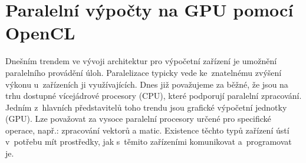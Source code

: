 %

\chapter{Paralelní výpočty na GPU pomocí OpenCL}
\label{ch:opencl}
Dnešním trendem ve vývoji architektur pro výpočetní zařízení je umožnění paralelního provádění
úloh. Paralelizace typicky vede ke~znatelnému zvýšení výkonu u~zařízeních ji využívajících. Dnes již
považujeme za běžné, že jsou na trhu dostupné vícejádrové procesory (CPU), které podporují paralelní
zpracování. Jedním z~hlavních představitelů toho trendu jsou grafické výpočetní jednotky (GPU). Lze
považovat za vysoce paralelní procesory určené pro specifické operace, např.: zpracování vektorů a
matic. Existence těchto typů zařízení ústí v~potřebu mít prostředky, jak s~těmito zařízeními
komunikovat a~programovat je.

